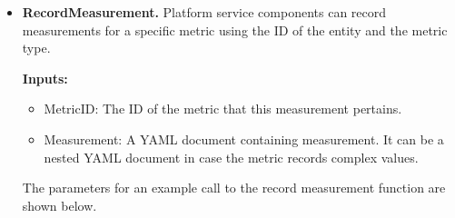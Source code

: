 \begin{itemize}
\item \textbf{RecordMeasurement.} Platform service components can record measurements for a specific metric  using the ID of the entity and the metric type. 
\par \noindent \textbf{Inputs:}
\begin{itemize}
\item MetricID: The ID of the metric that this measurement pertains.
\item Measurement: A YAML document containing measurement. It can be a nested YAML document in case the metric records complex values.
\end{itemize}
\par The parameters for an example call to the record measurement function are shown below.

\end{itemize}
